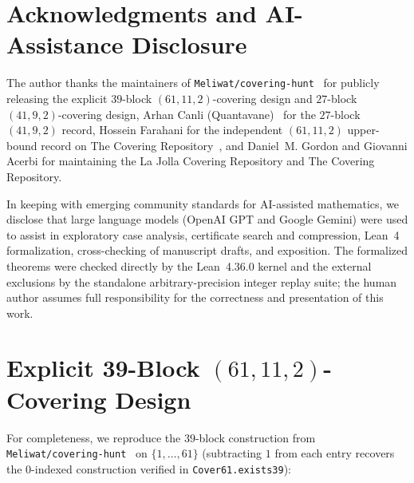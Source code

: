 \documentclass[11pt,a4paper]{article}
\theoremstyle{definition}
\theoremstyle{remark}
\begin{document}
\section*{Acknowledgments and AI-Assistance Disclosure}

The author thanks the maintainers of \texttt{Meliwat/covering-hunt}~\cite{Meliwat2026} for publicly releasing the explicit $39$-block $(61,11,2)$-covering design and $27$-block $(41,9,2)$-covering design, Arhan Canli (Quantavane)~\cite{Canli2026} for the $27$-block $(41,9,2)$ record, Hossein Farahani for the independent $(61,11,2)$ upper-bound record on The Covering Repository~\cite{AcerbiCR}, and Daniel~M. Gordon and Giovanni Acerbi for maintaining the La Jolla Covering Repository and The Covering Repository.

In keeping with emerging community standards for AI-assisted mathematics, we disclose that large language models (OpenAI GPT and Google Gemini) were used to assist in exploratory case analysis, certificate search and compression, Lean~4 formalization, cross-checking of manuscript drafts, and exposition. The formalized theorems were checked directly by the Lean~4.36.0 kernel and the external exclusions by the standalone arbitrary-precision integer replay suite; the human author assumes full responsibility for the correctness and presentation of this work.

\appendix

\section{Explicit 39-Block \texorpdfstring{$(61,11,2)$}{(61,11,2)}-Covering Design}\label{app:cover39}

For completeness, we reproduce the $39$-block construction from \texttt{Meliwat/covering-hunt}~\cite{Meliwat2026} on $\{1,\dots,61\}$ (subtracting $1$ from each entry recovers the $0$-indexed construction verified in \texttt{Cover61.exists39}):
\end{document}
